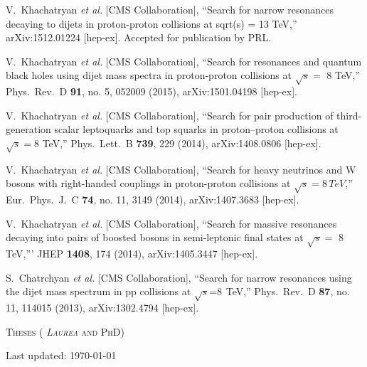 \documentclass[10pt, a4paper]{article}
\begin{document}
\begin{thebibliography}{599}

  V.~Khachatryan {\it et al.} [CMS Collaboration],
  ``Search for narrow resonances decaying to dijets in proton-proton collisions at sqrt(s) = 13 TeV,''
  arXiv:1512.01224 [hep-ex]. Accepted for publication by PRL.

  V.~Khachatryan {\it et al.} [CMS Collaboration],
  ``Search for resonances and quantum black holes using dijet mass spectra in proton-proton collisions at $\sqrt{s} =$ 8 TeV,''
  Phys.\ Rev.\ D {\bf 91}, no. 5, 052009 (2015), arXiv:1501.04198 [hep-ex].

  V.~Khachatryan {\it et al.} [CMS Collaboration],
  ``Search for pair production of third-generation scalar leptoquarks and top squarks in proton–proton collisions at $\sqrt{s}=$8 TeV,''
  Phys.\ Lett.\ B {\bf 739}, 229 (2014), arXiv:1408.0806 [hep-ex].

  V.~Khachatryan {\it et al.} [CMS Collaboration],
  ``Search for heavy neutrinos and $\mathrm {W}$ bosons with
  right-handed couplings in proton-proton collisions at $\sqrt{s} = 8 \, TeV $,''
  Eur.\ Phys.\ J.\ C {\bf 74}, no. 11, 3149 (2014), arXiv:1407.3683 [hep-ex].

  V.~Khachatryan {\it et al.} [CMS Collaboration],
  ``Search for massive resonances decaying into pairs of boosted bosons in semi-leptonic final states at $\sqrt{s} =$ 8 TeV,'''
  JHEP {\bf 1408}, 174 (2014), arXiv:1405.3447 [hep-ex].

  S.~Chatrchyan {\it et al.} [CMS Collaboration],
  ``Search for narrow resonances using the dijet mass spectrum in pp collisions at $\sqrt{s}$=8  TeV,''
  Phys.\ Rev.\ D {\bf 87}, no. 11, 114015 (2013), arXiv:1302.4794 [hep-ex].



\vspace{0.1cm} \begin{center} \textsc{Theses ( \textit{Laurea} and PhD)} \end{center} \vspace{0.05cm}



\end{thebibliography}

\vfill{}
\hrulefill

\begin{center}
{\footnotesize Last updated: \today}
\end{center}
\end{document}
